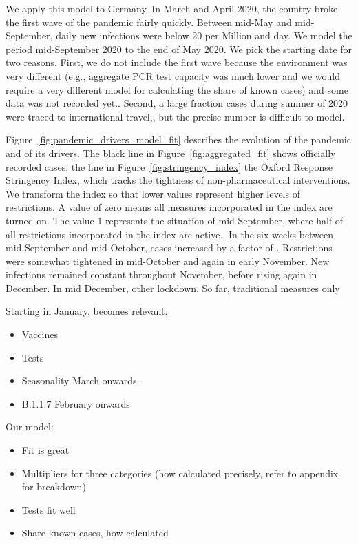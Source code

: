 We apply this model to Germany. In March and April 2020, the country broke the first wave of the pandemic fairly quickly. Between mid-May and mid-September, daily new infections were below 20 per Million and day. We model the period mid-September 2020 to the end of May 2020. We pick the starting date for two reasons. First, we do not include the first wave because the environment was very different (e.g., aggregate PCR test capacity was much lower and we would require a very different model for calculating the share of known cases) and some data was not recorded yet.. Second, a large fraction cases during summer of 2020 were traced to international travel,, but the precise number is difficult to model.

Figure~\ref{fig:pandemic_drivers_model_fit} describes the evolution of the pandemic and of its drivers. The black line in Figure~\ref{fig:aggregated_fit} shows officially recorded cases; the  line in Figure~\ref{fig:stringency_index} the Oxford Response Stringency Index\cite{Hale2020}, which tracks the tightness of non-pharmaceutical interventions. We transform the index so that lower values represent higher levels of restrictions. A value of zero means all measures incorporated in the index are turned on. The value 1 represents the situation of mid-September, where half of all restrictions incorporated in the index are active.. In the six weeks between mid September and mid October, cases increased by a factor of . Restrictions were somewhat tightened in mid-October and again in early November. New infections remained constant throughout November, before rising again in December. In mid December, other lockdown. So far, traditional measures only

Starting in January,  becomes relevant.
\begin{itemize}
    \item Vaccines
    \item Tests
    \item Seasonality March onwards.
    \item B.1.1.7 February onwards
\end{itemize}

Our model:
\begin{itemize}
    \item Fit is great
    \item Multipliers for three categories (how calculated precisely, refer to appendix for breakdown)
    \item Tests fit well
    \item Share known cases, how calculated
\end{itemize}

